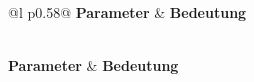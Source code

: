 {\footnotesize
\begin{longtable}{@{}l p{}@{}}
\toprule
\textbf{Parameter} & \textbf{Bedeutung} \\
\midrule
\endfirsthead

 \\
\toprule
\textbf{Parameter} & \textbf{Bedeutung} \\
\midrule
\endhead

\midrule
{} \\
\endfoot

\bottomrule
\caption{Startparameter des Nodes \texttt{vision\_pose\_uxrce\_node}}
\label{tab:vision_pose_params} \\
\endlastfoot


\end{longtable}}
